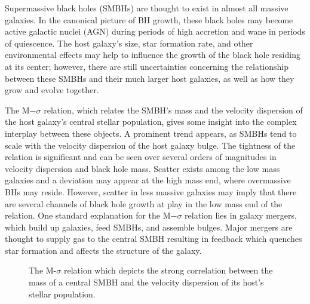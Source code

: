 \documentclass[12pt,headA,chapB]{fiskthesis}
\begin{document}
Supermassive black holes (SMBHs) are thought to exist in almost all massive galaxies. \citep{Kormendy2013} In the canonical picture of BH growth, these black holes may become active galactic nuclei (AGN) during periods of high accretion and wane in periods of quiescence. \citep{Alexander2005,Papovich2006,Volonteri2012} The host galaxy's size, star formation rate, and other environmental effects may help to influence the growth of the black hole residing at its center; however, there are still uncertainties concerning the relationship between these SMBHs and their much larger host galaxies, as well as how they grow and evolve together. \citep{Haehnelt2000,DiMatteo2005,Hopkins2006,Fu2008,Sijacki2009,Silverman2009,Mullaney2012}

The M$-\sigma$ relation, which relates the SMBH's mass and the velocity dispersion of the host galaxy's central stellar population, gives some insight into the complex interplay between these objects. \citep{Ferrarese2000} A prominent trend appears, as SMBHs tend to scale with the velocity dispersion of the host galaxy bulge. The tightness of the relation is significant and can be seen over several orders of magnitudes in velocity dispersion and black hole mass. \citep{Merritt2001,Graham2011,Mcconnell2013,Kormendy2013} Scatter exists among the low mass galaxies and a deviation may appear at the high mass end, where overmassive BHs may reside. \citep{VanDenBosch2007,Moster2010,Natarajan2011} However, scatter in less massive galaxies may imply that there are several channels of black hole growth at play in the low mass end of the relation. \citep{Micic2007,Volonteri2009,Reines2013,Graham2014} One standard explanation for the M$-\sigma$ relation lies in galaxy mergers, which build up galaxies, feed SMBHs, and assemble bulges. \citep{DiMatteo2005,Shen2008} Major mergers are thought to supply gas to the central SMBH resulting in feedback which quenches star formation and affects the structure of the galaxy. 

\begin{figure}
\centerline{}
\caption[M-$\sigma$ Relation]{The M-$\sigma$ relation which depicts the strong correlation between the mass of a central SMBH and the velocity dispersion of its host's stellar population. \cite{Xiao2011}}
\label{msigma} 
\end{figure}

\end{document}
